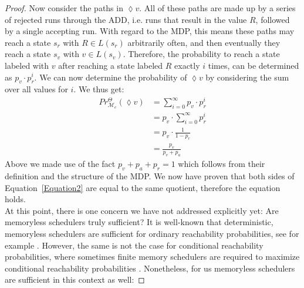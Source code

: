 \begin{proof}
	Now consider the paths in $\lozenge v$. 
	All of these paths are made up by a series of rejected runs through the ADD, i.e. runs that result in the value $R$, followed by a single accepting run.
	With regard to the MDP, this means these paths may reach a state $s_r$ with $R \in L(s_r)$ arbitrarily often, and then eventually they reach a state $s_v$ with $v \in L(s_v)$. 
	Therefore, the probability to reach a state labeled with $v$ after reaching a state labeled $R$ exactly $i$ times, can be determined as $p_v \cdot p^i_r$.
	We can now determine the probability of $\lozenge v$ by considering the sum over all values for $i$.
	We thus get:
	\begin{align*}
		Pr^\Theta_{\mathcal{M}_e}(\lozenge v) &= \sum\limits_{i = 0}^{\infty} p_v \cdot p^i_r \\
		&=  p_v \cdot \sum\limits_{i = 0}^{\infty}  p^i_r \\
		&= p_v \cdot \frac{1}{1- p_r} \\
		&= \frac{p_v}{p_v + p_a}
	\end{align*}
	Above we made use of the fact $p_v + p_a + p_r = 1$ which follows from their definition and the structure of the MDP.
	We now have proven that both sides of Equation~\ref{Equation2} are equal to the same quotient, therefore the equation holds.\\
	
	At this point, there is one concern we have not addressed explicitly yet:
	Are memoryless schedulers truly sufficient?
	It is well-known that deterministic, memoryless schedulers are sufficient for ordinary reachability probabilities, see for example \citet{forejt2011automated}.
	However, the same is not the case for conditional reachability probabilities, where sometimes finite memory schedulers are required to maximize conditional reachability probabilities \cite{andres2008conditional}.
	Nonetheless, for us memoryless schedulers are sufficient in this context as well:
	 

\end{proof}
